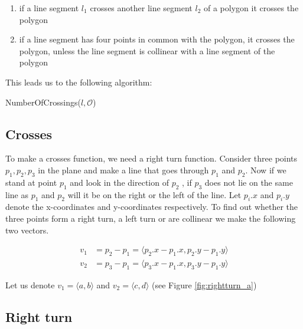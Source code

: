 \begin{enumerate}
	\item if a line segment $l_1$ crosses another line segment $l_2$ of a polygon it 
	      crosses the polygon
	\item if a line segment has four points in common with the polygon, it crosses the
		  polygon, unless the line segment is collinear with a line segment of the
		  polygon 
\end{enumerate}

This leads us to the following algorithm:
\begin{algorithm} 
	\caption{NumberOfCrossings($l,\mathcal{O}$)}
	\begin{algorithmic}[1] 
				\EndIf
			\EndFor
			\EndIf
		\EndFor
	\end{algorithmic}
\end{algorithm}

\subsection{Crosses}
To make a crosses function, we need a right turn function. Consider three
points $p_1,p_2,p_3$ in the plane and make a line that goes through $p_1$ and $p_2$. 
Now if we stand at point $p_1$ and look in the direction of $p_2$ , if $p_3$
does not lie on the same line as $p_1$ and $p_2$ will it be on the
right or the left of the line. Let $p_i.x$ and $p_i.y$ denote the x-coordinates
and y-coordinates respectively. To find out whether the three points form a right turn, 
a left turn or are collinear we make the following two vectors.

\begin{align*}
	v_1 &=p_2-p_1 = \langle p_2.x-p_1.x,p_2.y-p_1.y\rangle\\
	v_2 &=p_3-p_1 = \langle p_3.x-p_1.x,p_3.y-p_1.y\rangle
\end{align*}

Let us denote $v_1 = \langle a,b\rangle$ and $v_2 = \langle c,d\rangle$
(see Figure \ref{fig:rightturn_a})

\subsection{Right turn}

